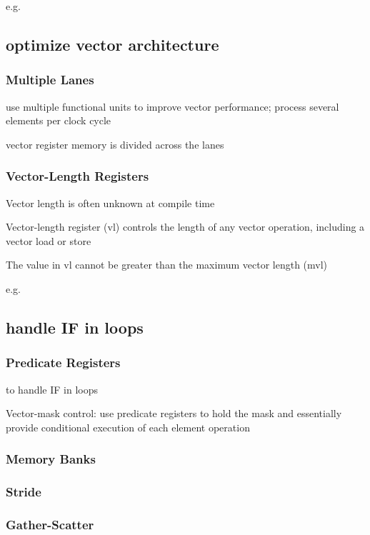 e.g. %

\subsection{optimize vector architecture}
\subsubsection{Multiple Lanes}
use multiple functional units to
improve vector performance;
process several elements per
clock cycle

vector register memory is divided across the lanes

\subsubsection{Vector-Length Registers}
Vector length is often unknown at
compile time

Vector-length register (vl) controls the
length of any vector operation,
including a vector load or store

The value in vl cannot be greater than
the maximum vector length (mvl)

e.g. %

\subsection{handle IF in loops}
\subsubsection{Predicate Registers}
to handle IF in loops

Vector-mask control: 
use predicate registers to hold the mask
and essentially provide conditional
execution of each element operation

\subsubsection{Memory Banks}


\subsubsection{Stride}

\subsubsection{Gather-Scatter}


